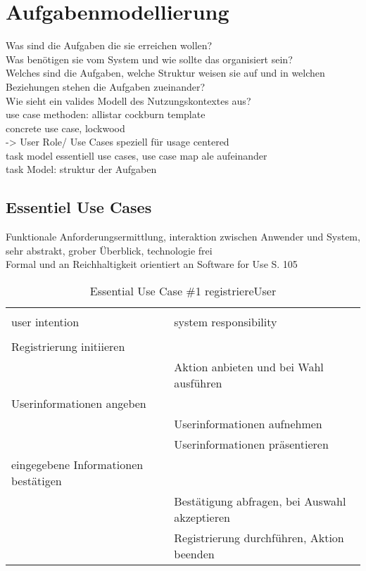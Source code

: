 
\section{Aufgabenmodellierung}

Was sind die Aufgaben die sie erreichen wollen?\\
Was benötigen sie vom System und wie sollte das organisiert sein?\\
Welches sind die Aufgaben, welche Struktur weisen sie auf und in welchen Beziehungen stehen die Aufgaben zueinander?\\
Wie sieht ein valides Modell des Nutzungskontextes aus?\\

use case methoden: allistar cockburn template \\
concrete use case, lockwood\\


-> User Role/ Use Cases speziell für usage centered	\\
task model essentiell use cases, use case map ale aufeinander\\

task Model: struktur der Aufgaben\\


\subsection{Essentiel Use Cases}
Funktionale Anforderungsermittlung, interaktion zwischen Anwender und System, sehr abstrakt, grober Überblick, technologie frei\\
Formal und an Reichhaltigkeit orientiert an Software for Use S. 105

\begin{table}[H]
\caption{Essential Use Case \#1 registriereUser }
\centering
\begin{tabular}{l l}
\\ [-0.5ex]

\hline\hline
\\ [-0.5ex]
user intention & system responsibility
\\ [1.5ex]
\hline
\\ [-0.5ex]
Registrierung initiieren				& 											\\[1ex]
										& Aktion anbieten und bei Wahl ausführen	\\[1ex]
Userinformationen angeben 				& 											\\[1ex] 
										& Userinformationen aufnehmen				\\[1ex]
										& Userinformationen präsentieren			\\[1ex]
eingegebene Informationen bestätigen	& 											\\[1ex]
										& Bestätigung abfragen, bei Auswahl akzeptieren  \\[1ex]
										& Registrierung durchführen, Aktion beenden	\\[1ex]


\hline
\end{tabular}
\label{tab:registrieren}
\end{table}


